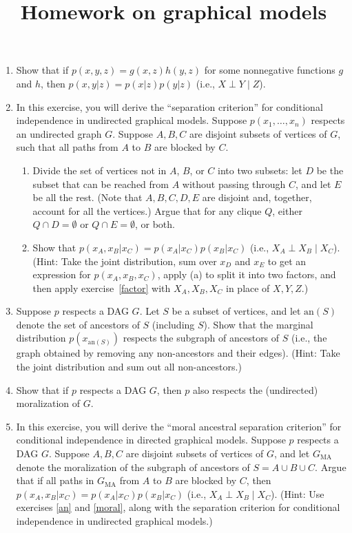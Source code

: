 \documentclass[12pt]{article}
\title{Homework on graphical models}
\date{}
\begin{document}
\maketitle

\begin{enumerate}
    \item\label{factor} Show that if $p(x,y,z) = g(x,z) h(y,z)$ for some nonnegative functions $g$ and $h$, then $p(x,y|z) = p(x|z)p(y|z)$ (i.e., $X\perp Y\mid Z$).
\item In this exercise, you will derive the ``separation criterion'' for conditional independence in undirected graphical models.
    Suppose $p(x_1,\ldots,x_n)$ respects an undirected graph $G$.
    Suppose $A,B,C$ are disjoint subsets of vertices of $G$, such that all paths from $A$ to $B$ are blocked by $C$.
    \begin{enumerate}
        \item Divide the set of vertices not in $A$, $B$, or $C$ into two subsets: let $D$ be the subset that can be reached from $A$ without passing through $C$, and let $E$ be all the rest.
            (Note that $A,B,C,D,E$ are disjoint and, together, account for all the vertices.)
            Argue that for any clique $Q$, either $Q\cap D = \emptyset$ or $Q\cap E = \emptyset$, or both.
        \item Show that $p(x_A,x_B|x_C) = p(x_A|x_C)p(x_B|x_C)$ (i.e., $X_A \perp X_B \mid  X_C$). (Hint: Take the joint distribution, sum over $x_D$ and $x_E$ to get an expression for $p(x_A,x_B,x_C)$, apply (a) to split it into two factors, and then apply exercise~\ref{factor} with $X_A,X_B,X_C$ in place of $X,Y,Z$.)
    \end{enumerate}
\item\label{an} Suppose $p$ respects a DAG $G$. Let $S$ be a subset of vertices, and let $\mathrm{an}(S)$ denote the set of ancestors of $S$ (including $S$).  Show that the marginal distribution $p(x_{\mathrm{an}(S)})$ respects the subgraph of ancestors of $S$ (i.e., the graph obtained by removing any non-ancestors and their edges). (Hint: Take the joint distribution and sum out all non-ancestors.)
\item\label{moral} Show that if $p$ respects a DAG $G$, then $p$ also respects the (undirected) moralization of $G$.
\item In this exercise, you will derive the ``moral ancestral separation criterion'' for conditional independence in directed graphical models.
      Suppose $p$ respects a DAG $G$. 
      Suppose $A,B,C$ are disjoint subsets of vertices of $G$, and let $G_\text{MA}$ denote the moralization of the subgraph of ancestors of $S = A\cup B\cup C$.
      Argue that if all paths in $G_\text{MA}$ from $A$ to $B$ are blocked by $C$, then $p(x_A,x_B|x_C) = p(x_A|x_C)p(x_B|x_C)$ (i.e., $X_A\perp X_B \mid  X_C$).
      (Hint: Use exercises \ref{an} and \ref{moral}, along with the separation criterion for conditional independence in undirected graphical models.)
\end{enumerate}
\end{document}
